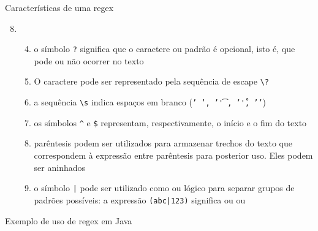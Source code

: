 \begin{frame}[fragile]{Características de uma regex}

    \begin{enumerate}
        \setcounter{enumi}{7}
        \item[] \begin{enumerate}
            \setcounter{enumii}{3}
            \item o símbolo \verb|?| significa que o caractere ou padrão é opcional, isto é, que pode ou não ocorrer no texto
        \pause
            \item O caractere  pode ser representado pela sequência de escape 
                \verb|\?|
        \pause
            \item a sequência \verb|\s| indica espaços em branco (\texttt{' ',  '\t', '\r', '\n'})
        \pause
            \item os símbolos \verb|^| e \verb|$| representam, respectivamente, o início e o fim 
                do texto
        \pause
            \item parêntesis podem ser utilizados para armazenar trechos do texto que correspondem à expressão entre parêntesis para posterior uso. Eles podem ser aninhados
        \pause
            \item o símbolo \texttt{|} pode ser utilizado como ou lógico para separar grupos de padrões possíveis: a expressão \texttt{(abc|123)} significa ou  ou 
        \end{enumerate}
    \end{enumerate}

\end{frame}

\begin{frame}[fragile]{Exemplo de uso de regex em Java}
\end{frame}
